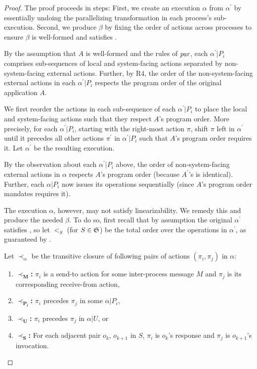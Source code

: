 \begin{proof}
The proof proceeds in steps: First, we create an execution $\alpha$ from
$\alpha^\prime$ by essentially undoing the parallelizing transformation in
each process's sub-execution. Second, we produce $\beta$ by fixing the order
of actions across processes to ensure $\beta$ is well-formed and satisfies \SDL{}.

By the assumption that $A$ is well-formed and the rules of $\operatorname*{\textit{par}}$,
each $\alpha^\prime | P_i$ comprises sub-sequences of local and
system-facing actions separated by non-system-facing external actions.
Further, by R4, the order of the non-system-facing external
actions in each $\alpha^\prime | P_i$ respects the program order of the
original application $A$. 

We first reorder the actions in each sub-sequence of each $\alpha^\prime | P_i$
to place the local and system-facing actions such that they respect $A$'s program
order. More precisely, for each $\alpha^\prime | P_i$, starting with the right-most
action $\pi$, shift $\pi$ left in $\alpha^\prime$ until it precedes
all other actions $\pi^\prime$ in $\alpha^\prime | P_i$ such that $A$'s program
order requires it. Let $\alpha^\prime$ be the resulting execution.

By the observation about each $\alpha^\prime | P_i$ above, the order of
non-system-facing external actions in $\alpha$ respects $A$'s program order
(because $A^\prime$'s is identical). Further, each $\alpha | P_i$ now
issues its operations sequentially (since $A$'s program order mandates
requires it).

The execution $\alpha$, however, may not satisfy linearizability. We remedy this
and produce the needed $\beta$. To do so, first recall that by assumption the 
original  $\alpha^\prime$ satisfies \MDL{}, so let $<_S$ (for $S \in \mathfrak{S}$) be the total order over the operations in $\alpha^\prime$, as guaranteed by \MDL{}.

Let $\prec_{\alpha}$ be the transitive closure of following pairs of actions
$(\pi_i, \pi_j)$ in $\alpha$:
\begin{enumerate}
    \item $\mathbf{\prec_M}$\textbf{:} $\pi_i$ is a send-to action for some
    inter-process message $M$ and $\pi_j$ is its corresponding receive-from action,
    \item $\mathbf{\prec_{P_i}}$\textbf{:} $\pi_i$ precedes $\pi_j$ in some $\alpha | P_i$,
    \item $\mathbf{\prec_U}$\textbf{:} $\pi_i$ precedes $\pi_j$ in $\alpha | U$, or
    \item $\mathbf{\prec_S}$\textbf{:} For each adjacent pair $o_k$, $o_{k+1}$
    in $S$, $\pi_i$ is $o_k$'s response and $\pi_j$ is $o_{k+1}$'s invocation.
\end{enumerate}


\end{proof}
